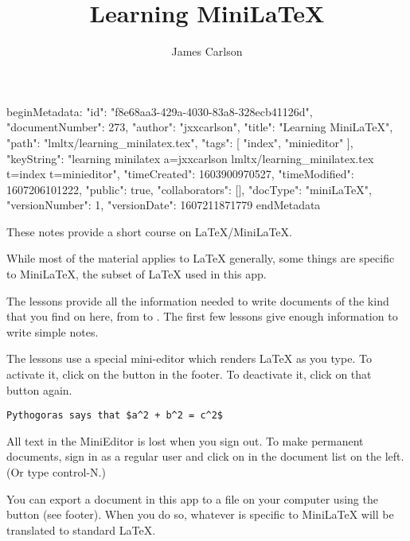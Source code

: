 beginMetadata:
{
    "id": "f8e68aa3-429a-4030-83a8-328ecb41126d",
    "documentNumber": 273,
    "author": "jxxcarlson",
    "title": "Learning MiniLaTeX",
    "path": "lmltx/learning_minilatex.tex",
    "tags": [
        "index",
        "minieditor"
    ],
    "keyString": "learning minilatex a=jxxcarlson lmltx/learning_minilatex.tex t=index t=minieditor",
    "timeCreated": 1603900970527,
    "timeModified": 1607206101222,
    "public": true,
    "collaborators": [],
    "docType": "miniLaTeX",
    "versionNumber": 1,
    "versionDate": 1607211871779
}
endMetadata
\title{Learning MiniLaTeX}

\author{James Carlson}


\maketitle

These notes  provide a short course on LaTeX/MiniLaTeX. 

While most of the material applies to LaTeX generally, some things are specific to MiniLaTeX, the subset of LaTeX used in this app.

The lessons provide all the information needed to write documents of the kind that you find on here, from  to . The first few lessons give enough information to write simple notes.  


The lessons use a special mini-editor which renders LaTeX as you type.  To activate it, click on the  button in the footer.  To deactivate it, click on that button again. 

\begin{verbatim}
Pythogoras says that $a^2 + b^2 = c^2$
\end{verbatim}


All text in the MiniEditor is lost when you sign out.  To make permanent documents, sign in as a regular user and  click on  in the document list on the left.  (Or type control-N.)



You can export a document in this app to a file on your computer using the  button (see footer). 
 When you do so, whatever is specific to MiniLaTeX will be translated to standard LaTeX.

